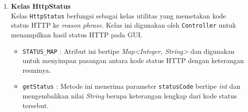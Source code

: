 \begin{enumerate}
    \item \textbf{Kelas HttpStatus}\\
    Kelas \texttt{HttpStatus} berfungsi sebagai kelas utilitas yang memetakan kode status HTTP ke \textit{reason phrase}. Kelas ini digunakan oleh \texttt{Controller} untuk menampilkan hasil status HTTP pada GUI.
    \begin{itemize}
        \item \texttt{STATUS\_MAP} : Atribut ini bertipe \textit{Map<Integer, String>} dan digunakan untuk menyimpan pasangan antara kode status HTTP dengan keterangan resminya.
        \item \texttt{getStatus} : Metode ini menerima parameter \texttt{statusCode} bertipe \textit{int} dan mengembalikan nilai \textit{String} berupa keterangan lengkap dari kode status tersebut.
    \end{itemize}
\end{enumerate}

